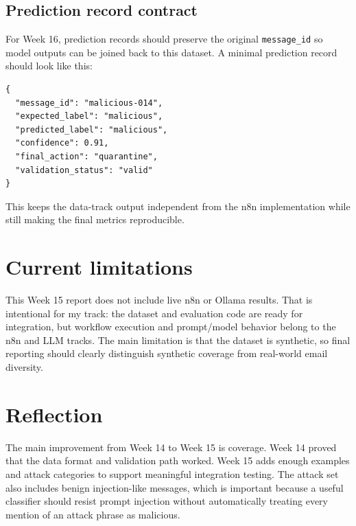 \documentclass[11pt,a4paper]{article}
\begin{document}
\subsection{Prediction record contract}

For Week 16, prediction records should preserve the original \texttt{message\_id} so model outputs can be joined back to this dataset. A minimal prediction record should look like this:

\begin{lstlisting}[caption={Future prediction record shape for metric calculation.}]
{
  "message_id": "malicious-014",
  "expected_label": "malicious",
  "predicted_label": "malicious",
  "confidence": 0.91,
  "final_action": "quarantine",
  "validation_status": "valid"
}
\end{lstlisting}

This keeps the data-track output independent from the n8n implementation while still making the final metrics reproducible.

\section{Current limitations}

This Week 15 report does not include live n8n or Ollama results. That is intentional for my track: the dataset and evaluation code are ready for integration, but workflow execution and prompt/model behavior belong to the n8n and LLM tracks. The main limitation is that the dataset is synthetic, so final reporting should clearly distinguish synthetic coverage from real-world email diversity.

\section{Reflection}

The main improvement from Week 14 to Week 15 is coverage. Week 14 proved that the data format and validation path worked. Week 15 adds enough examples and attack categories to support meaningful integration testing. The attack set also includes benign injection-like messages, which is important because a useful classifier should resist prompt injection without automatically treating every mention of an attack phrase as malicious.
\end{document}
